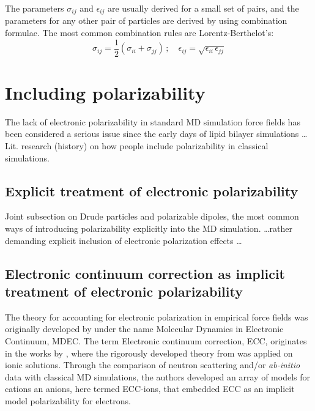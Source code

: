 The parameters $\sigma_{ij}$ and $\epsilon_{ij}$ are usually derived for a small set of pairs,
and the parameters for any other pair of particles are derived by using combination formulae. 
The most common combination rules are Lorentz-Berthelot's:
\begin{equation}
 \sigma _{ij} = \frac{1}{2} (\sigma _{ii} + \sigma _{jj}) \, ; \quad \epsilon _{ij} = \sqrt{\epsilon _{ii} \, \epsilon _{jj}} 
\end{equation}









\section{Including polarizability}

The lack of electronic polarizability in standard MD simulation
force fields has been considered a serious issue since the early days of
lipid bilayer simulations \dots
  Lit. research (history) on how people include polarizability in classical simulations. 

\subsection{Explicit treatment of electronic polarizability}

 Joint subsection on Drude particles and polarizable dipoles, the most common ways of introducing polarizability explicitly into the MD simulation. 
\ldots rather demanding explicit inclusion
of electronic polarization effects \cite{lucas12,chowdhary13} \dots





\subsection{Electronic continuum correction as implicit treatment of electronic polarizability}
\label{section:ecc}

The theory for accounting for electronic polarization in empirical force fields
was originally developed by \citet{leontyev09} under the name Molecular Dynamics in Electronic Continuum, MDEC. 
The term Electronic continuum correction, ECC, originates in the works by \citet{Pluharova2014, kohagen14, kohagen16, martinek17},
where the rigorously developed theory from \citep{leontyev14} was applied on ionic solutions.
Through the comparison of neutron scattering and/or \emph{ab-initio} data with classical MD simulations, 
the authors developed an array of models for cations an anions, here termed ECC-ions,
that embedded ECC as an implicit model polarizability for electrons. 

